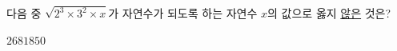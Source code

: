 다음 중 $\sqrt{2^3\times 3^2\times x}$가 자연수가 되도록 하는 자연수 $x$의 값으로 옳지 \underline{않은} 것은?
\begin{choices32}{$2$}{$6$}{$8$}{$18$}{$50$}\end{choices32}
